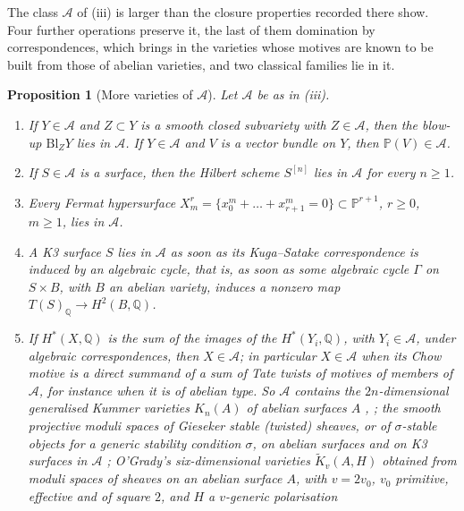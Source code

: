 \documentclass[11pt,reqno]{amsart}
\theoremstyle{plain}
\newtheorem{proposition}[theorem]{Proposition}
\theoremstyle{definition}
\theoremstyle{remark}
\newcommand{\QQ}{\mathbb{Q}}
\newcommand{\PP}{\mathbb{P}}
\begin{document}
The class $\mathcal{A}$ of (iii) is larger than the
closure properties recorded there show. Four further operations
preserve it, the last of them domination by correspondences, which brings in
the varieties whose motives are known to be built from those of abelian
varieties, and two classical families lie in it.

\begin{proposition}[More varieties of $\mathcal{A}$]\label{prop:aclosure}
Let $\mathcal{A}$ be as in (iii).
\begin{enumerate}[label=\textup{(\roman*)},leftmargin=2.6em,itemsep=2pt]
\item If $Y\in\mathcal{A}$ and $Z\subset Y$ is a smooth closed subvariety
  with $Z\in\mathcal{A}$, then the blow-up $\mathrm{Bl}_{Z}Y$ lies in
  $\mathcal{A}$. If $Y\in\mathcal{A}$ and $V$ is a vector bundle on $Y$,
  then $\PP(V)\in\mathcal{A}$.
\item If $S\in\mathcal{A}$ is a surface, then the Hilbert scheme $S^{[n]}$
  lies in $\mathcal{A}$ for every $n\ge1$.
\item Every Fermat hypersurface
  $X^{r}_{m}=\{x_{0}^{m}+\dots+x_{r+1}^{m}=0\}\subset\PP^{r+1}$, $r\ge0$,
  $m\ge1$, lies in $\mathcal{A}$.
\item A K3 surface $S$ lies in $\mathcal{A}$ as soon as its Kuga--Satake
  correspondence is induced by an algebraic cycle, that is, as soon as some
  algebraic cycle $\Gamma$ on $S\times B$, with $B$ an abelian variety,
  induces a nonzero map $T(S)_{\QQ}\to H^{2}(B,\QQ)$.
\item If $H^{*}(X,\QQ)$ is the sum of the images of the $H^{*}(Y_{i},\QQ)$,
  with $Y_{i}\in\mathcal{A}$, under algebraic correspondences, then
  $X\in\mathcal{A}$; in particular $X\in\mathcal{A}$ when its Chow motive is
  a direct summand of a sum of Tate twists of motives of members of
  $\mathcal{A}$, for instance when it is of abelian type. So $\mathcal{A}$
  contains the $2n$-dimensional generalised Kummer varieties $K_{n}(A)$ of
  abelian surfaces $A$ \cite[Theorem~2.7, Corollary~2.8]{Xu15},
  \cite[Theorem~1.5]{FTV19}; the smooth projective moduli spaces of Gieseker
  stable (twisted) sheaves, or of $\sigma$-stable objects for a generic
  stability condition $\sigma$, on abelian surfaces and on K3 surfaces in
  $\mathcal{A}$ \cite[Theorem~0.1, Remark~2.1]{Bue20}; O'Grady's
  six-dimensional varieties $\widetilde K_{v}(A,H)$ obtained from moduli
  spaces of sheaves on an abelian surface $A$, with $v=2v_{0}$, $v_{0}$
  primitive, effective and of square $2$, and $H$ a $v$-generic polarisation

\end{enumerate}
\end{proposition}
\end{document}

